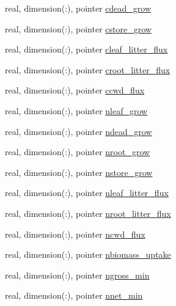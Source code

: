 \begin{DoxyCompactItemize}
\item 
real, dimension(\+:), pointer \hyperlink{structed__state__vars_1_1edtype_a799ca5adcb9530f4103fd0c4693d9849}{cdead\+\_\+grow}
\item 
real, dimension(\+:), pointer \hyperlink{structed__state__vars_1_1edtype_a3b23d174488a370c6c462c3c789330e0}{cstore\+\_\+grow}
\item 
real, dimension(\+:), pointer \hyperlink{structed__state__vars_1_1edtype_a2304159badcafb299abbe9a06bd3c4f2}{cleaf\+\_\+litter\+\_\+flux}
\item 
real, dimension(\+:), pointer \hyperlink{structed__state__vars_1_1edtype_a156191af407a685e6f870a09833b4587}{croot\+\_\+litter\+\_\+flux}
\item 
real, dimension(\+:), pointer \hyperlink{structed__state__vars_1_1edtype_a945a8d9c9459726e8e49724f136f25f6}{ccwd\+\_\+flux}
\item 
real, dimension(\+:), pointer \hyperlink{structed__state__vars_1_1edtype_afc425abf8780b4346f5cd90a35e60f22}{nleaf\+\_\+grow}
\item 
real, dimension(\+:), pointer \hyperlink{structed__state__vars_1_1edtype_a9d86f681b16e53151ec9655b08fe75b2}{ndead\+\_\+grow}
\item 
real, dimension(\+:), pointer \hyperlink{structed__state__vars_1_1edtype_abbe80b21dd5d8143eaedd139f38c7a0e}{nroot\+\_\+grow}
\item 
real, dimension(\+:), pointer \hyperlink{structed__state__vars_1_1edtype_a5483cc567c4be6a575e56d57c5804d3e}{nstore\+\_\+grow}
\item 
real, dimension(\+:), pointer \hyperlink{structed__state__vars_1_1edtype_a96afbcab8489f1c04da749d277b93aeb}{nleaf\+\_\+litter\+\_\+flux}
\item 
real, dimension(\+:), pointer \hyperlink{structed__state__vars_1_1edtype_a5ab644b8e30b3e047d9731fbe7fe5b7e}{nroot\+\_\+litter\+\_\+flux}
\item 
real, dimension(\+:), pointer \hyperlink{structed__state__vars_1_1edtype_aa424d9a5ac1ed2bce334b14550a1b6d4}{ncwd\+\_\+flux}
\item 
real, dimension(\+:), pointer \hyperlink{structed__state__vars_1_1edtype_ab14f41e41ba62189e8738bc73c143026}{nbiomass\+\_\+uptake}
\item 
real, dimension(\+:), pointer \hyperlink{structed__state__vars_1_1edtype_a8419f8f5876b0f784338bfa19efc448c}{ngross\+\_\+min}
\item 
real, dimension(\+:), pointer \hyperlink{structed__state__vars_1_1edtype_a91067ecd6dd3369d946ac1f393ba9610}{nnet\+\_\+min}

\end{DoxyCompactItemize}
